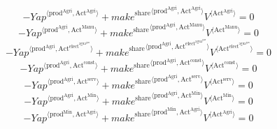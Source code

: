 \begin{equation}
-{{Y\!a\!p}}^{\langle \mathrm{prod}^{\mathrm{Agri}},\mathrm{Act}^{\mathrm{Agri}}\rangle} + {{{m\!a\!k\!e}^{\mathrm{share}}}^{\langle \mathrm{\mathrm{prod}^{\mathrm{Agri}}},\mathrm{\mathrm{Act}^{\mathrm{Agri}}}\rangle}} {{V}^{\langle \mathrm{Act}^{\mathrm{Agri}}\rangle}} = 0
\end{equation}
\begin{equation}
-{{Y\!a\!p}}^{\langle \mathrm{prod}^{\mathrm{Agri}},\mathrm{Act}^{\mathrm{Manu}}\rangle} + {{{m\!a\!k\!e}^{\mathrm{share}}}^{\langle \mathrm{\mathrm{prod}^{\mathrm{Agri}}},\mathrm{\mathrm{Act}^{\mathrm{Manu}}}\rangle}} {{V}^{\langle \mathrm{Act}^{\mathrm{Manu}}\rangle}} = 0
\end{equation}
\begin{equation}
-{{Y\!a\!p}}^{\langle \mathrm{prod}^{\mathrm{Agri}},\mathrm{Act}^{\mathrm{elect}^{\mathrm{agua}^{\mathrm{gas}}}}\rangle} + {{{m\!a\!k\!e}^{\mathrm{share}}}^{\langle \mathrm{\mathrm{prod}^{\mathrm{Agri}}},\mathrm{\mathrm{Act}^{\mathrm{elect}^{\mathrm{agua}^{\mathrm{gas}}}}}\rangle}} {{V}^{\langle \mathrm{Act}^{\mathrm{elect}^{\mathrm{agua}^{\mathrm{gas}}}}\rangle}} = 0
\end{equation}
\begin{equation}
-{{Y\!a\!p}}^{\langle \mathrm{prod}^{\mathrm{Agri}},\mathrm{Act}^{\mathrm{const}}\rangle} + {{{m\!a\!k\!e}^{\mathrm{share}}}^{\langle \mathrm{\mathrm{prod}^{\mathrm{Agri}}},\mathrm{\mathrm{Act}^{\mathrm{const}}}\rangle}} {{V}^{\langle \mathrm{Act}^{\mathrm{const}}\rangle}} = 0
\end{equation}
\begin{equation}
-{{Y\!a\!p}}^{\langle \mathrm{prod}^{\mathrm{Agri}},\mathrm{Act}^{\mathrm{serv}}\rangle} + {{{m\!a\!k\!e}^{\mathrm{share}}}^{\langle \mathrm{\mathrm{prod}^{\mathrm{Agri}}},\mathrm{\mathrm{Act}^{\mathrm{serv}}}\rangle}} {{V}^{\langle \mathrm{Act}^{\mathrm{serv}}\rangle}} = 0
\end{equation}
\begin{equation}
-{{Y\!a\!p}}^{\langle \mathrm{prod}^{\mathrm{Agri}},\mathrm{Act}^{\mathrm{Min}}\rangle} + {{{m\!a\!k\!e}^{\mathrm{share}}}^{\langle \mathrm{\mathrm{prod}^{\mathrm{Agri}}},\mathrm{\mathrm{Act}^{\mathrm{Min}}}\rangle}} {{V}^{\langle \mathrm{Act}^{\mathrm{Min}}\rangle}} = 0
\end{equation}
\begin{equation}
-{{Y\!a\!p}}^{\langle \mathrm{prod}^{\mathrm{Min}},\mathrm{Act}^{\mathrm{Agri}}\rangle} + {{{m\!a\!k\!e}^{\mathrm{share}}}^{\langle \mathrm{\mathrm{prod}^{\mathrm{Min}}},\mathrm{\mathrm{Act}^{\mathrm{Agri}}}\rangle}} {{V}^{\langle \mathrm{Act}^{\mathrm{Agri}}\rangle}} = 0
\end{equation}
